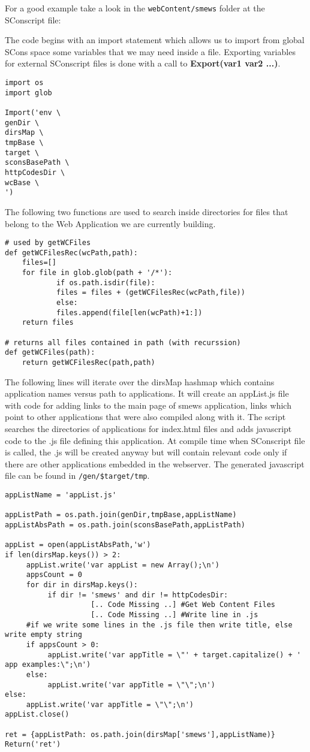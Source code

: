 \documentclass{report}
\begin{document}
For a good example take a look in the \texttt{webContent/smews} folder at the SConscript file:

The code begins with an import statement which allows us to import from global SCons space some variables that we may need inside a file. Exporting variables for external SConscript files is done with a call to \textbf{Export(var1 var2 ...)}.

\begin{verbatim}
import os
import glob

Import('env \
genDir \
dirsMap \
tmpBase \
target \
sconsBasePath \
httpCodesDir \
wcBase \
')
\end{verbatim}

The following two functions are used to search inside directories for files that belong to the Web Application we are currently building.
\begin{verbatim}
# used by getWCFiles
def getWCFilesRec(wcPath,path):
	files=[]
	for file in glob.glob(path + '/*'):
       		if os.path.isdir(file):
			files = files + (getWCFilesRec(wcPath,file))
       		else:
			files.append(file[len(wcPath)+1:])
	return files

# returns all files contained in path (with recurssion)
def getWCFiles(path):
	return getWCFilesRec(path,path)
\end{verbatim}

The following lines will iterate over the dirsMap hashmap which contains application names versus path to applications.
It will create an appList.js file with code for adding links to the main page of smews application, links which point to other applications that were also compiled along with it. The script searches the directories of applications for index.html files and adds javascript code to the .js file defining this application. At compile time when SConscript file is called, the .js will be created anyway but will contain relevant code only if there are other applications embedded in the webserver. The generated javascript file can be found in \texttt{/gen/\$target/tmp}.

\begin{verbatim}
appListName = 'appList.js'

appListPath = os.path.join(genDir,tmpBase,appListName)
appListAbsPath = os.path.join(sconsBasePath,appListPath)

appList = open(appListAbsPath,'w')
if len(dirsMap.keys()) > 2:
     appList.write('var appList = new Array();\n')
     appsCount = 0
     for dir in dirsMap.keys():
          if dir != 'smews' and dir != httpCodesDir:
                    [.. Code Missing ..] #Get Web Content Files
                    [.. Code Missing ..] #Write line in .js
     #if we write some lines in the .js file then write title, else write empty string
     if appsCount > 0:
          appList.write('var appTitle = \"' + target.capitalize() + ' app examples:\";\n')
     else:
          appList.write('var appTitle = \"\";\n')
else:
     appList.write('var appTitle = \"\";\n')
appList.close()

ret = {appListPath: os.path.join(dirsMap['smews'],appListName)}
Return('ret')
\end{verbatim}
\end{document}
